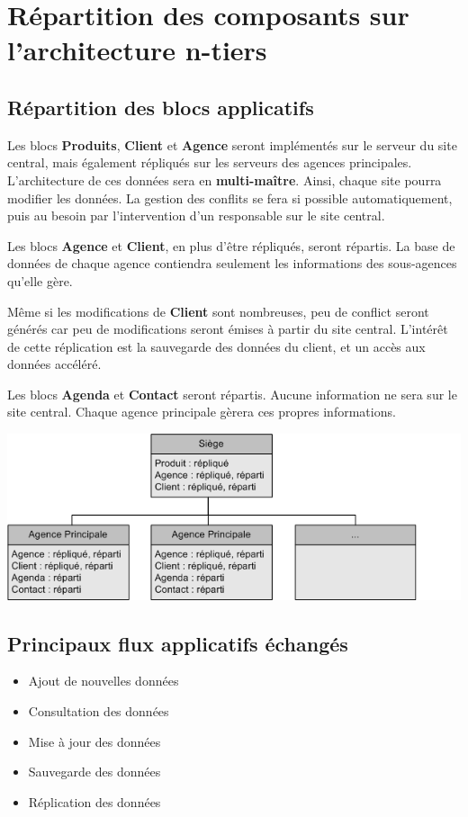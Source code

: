 
\section{Répartition des composants sur l'architecture n-tiers}

\subsection{Répartition des blocs applicatifs}

Les blocs \textbf{Produits}, \textbf{Client} et \textbf{Agence} seront implémentés sur le serveur du site central, mais également répliqués sur les serveurs des agences principales. L'architecture de ces données sera en \textbf{multi-maître}. Ainsi, chaque site pourra modifier les données. La gestion des conflits se fera si possible automatiquement, puis au besoin par l'intervention d'un responsable sur le site central.

Les blocs \textbf{Agence} et \textbf{Client}, en plus d'être répliqués, seront répartis. La base de données de chaque agence contiendra seulement les informations des sous-agences qu'elle gère.

Même si les modifications de \textbf{Client} sont nombreuses, peu de conflict seront générés car peu de modifications seront émises à partir du site central. L'intérêt de cette réplication est la sauvegarde des données du client, et un accès aux données accéléré.

Les blocs \textbf{Agenda} et \textbf{Contact} seront répartis. Aucune information ne sera sur le site central. Chaque agence principale gèrera ces propres informations.

\begin {center}
\includegraphics[width=\textwidth]{repartition_bloc.png}
\end {center}

\subsection{Principaux flux applicatifs échangés}

\begin{itemize}
\item Ajout de nouvelles données
\item Consultation des données
\item Mise à jour des données
\item Sauvegarde des données
\item Réplication des données
\end{itemize}
